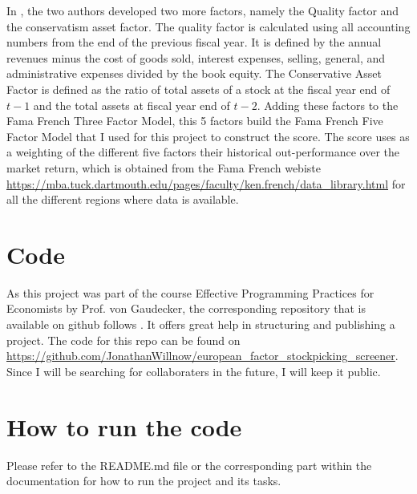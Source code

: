 \documentclass[11pt, a4paper, leqno]{article}
\begin{document}
  In \cite{FAMA20151}, the two authors developed two more factors, namely the Quality factor and the conservatism asset factor.
  The quality factor is calculated using all accounting numbers from the end of the previous fiscal year.
  It is defined by the annual revenues minus the cost of goods sold, interest expenses, selling, general, and administrative expenses divided by the book equity.
 The Conservative Asset Factor is defined as the ratio of total assets of a stock at the fiscal year end of $t-1$ and the total assets at fiscal year end of $t-2$.
 Adding these factors to the Fama French Three Factor Model, this 5 factors build the Fama French Five Factor Model that I used for this project to construct the score.
 The score uses as a weighting of the different five factors their historical out-performance over the market return, which is obtained from the Fama French 
 webiste \url{https://mba.tuck.dartmouth.edu/pages/faculty/ken.french/data_library.html} for all the different regions where data is available. 

\section{Code}
As this project was part of the course Effective Programming Practices for Economists by Prof. von Gaudecker, the corresponding repository 
that is available on github follows \citet{GaudeckerEconProjectTemplates}. It offers great help in structuring and publishing a project. 
The code for this repo can be found on \url{https://github.com/JonathanWillnow/european_factor_stockpicking_screener}. 
Since I will be searching for collaboraters in the future, I will keep it public.

\section{How to run the code}
Please refer to the README.md file or the corresponding part within the documentation for how to run the project and its tasks.
\end{document}
